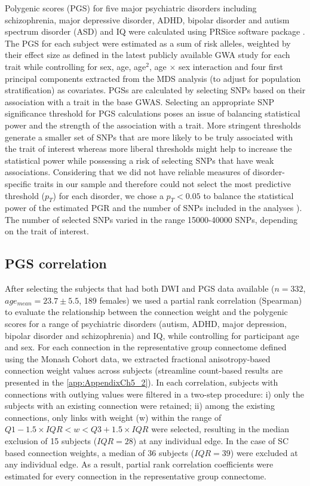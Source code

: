 Polygenic scores (PGS) for five major psychiatric disorders including schizophrenia, major depressive disorder, ADHD, bipolar disorder and autism spectrum disorder (ASD) and IQ were calculated using PRSice software package \citep{Euesden2015}. The PGS for each subject were estimated as a sum of risk alleles, weighted by their effect size as defined in the latest publicly available GWA study for each trait \citep{Neale2010,Ripke2014a,Ruderfer2018,Savage2018,AutismConsortium2017,Wray2018} while controlling for sex, age, age$^{2}$, age $\times$ sex interaction and four first principal components extracted from the MDS analysis (to adjust for population stratification) as covariates. PGSs are calculated by selecting SNPs based on their association with a trait in the base GWAS. Selecting an appropriate SNP significance threshold for PGS calculations poses an issue of balancing statistical power and the strength of the association with a trait. More stringent thresholds generate a smaller set of SNPs that are more likely to be truly associated with the trait of interest whereas more liberal thresholds might help to increase the statistical power while possessing a risk of selecting SNPs that have weak associations. Considering that we did not have reliable measures of disorder-specific traits in our sample and therefore could not select the most predictive threshold ($p_{T}$) for each disorder, we chose a $p_{T}<0.05$ to balance the statistical power of the estimated PGR and the number of SNPs included in the analyses \citep{Ripke2014a}). The number of selected SNPs varied in the range \num{15 000}-\num{40 000} SNPs, depending on the trait of interest.

\subsection{PGS correlation}

After selecting the subjects that had both DWI and PGS data available ($n= 332$, $age_{mean} = 23.7 \pm 5.5$, 189 females) we used a partial rank correlation (Spearman) to evaluate the relationship between the connection weight and the polygenic scores for a range of psychiatric disorders (autism, ADHD, major depression, bipolar disorder and schizophrenia) and IQ, while controlling for participant age and sex. For each connection in the representative group connectome defined using the Monash Cohort data, we extracted fractional anisotropy-based connection weight values across subjects (streamline count-based results are presented in the \ref{app:AppendixCh5_2}). In each correlation, subjects with connections with outlying values were filtered in a two-step procedure: i) only the subjects with an existing connection were retained; ii) among the existing connections, only links with weight (w) within the range of $Q1-1.5 \times IQR< w <Q3+1.5 \times IQR$ were selected, resulting in the median exclusion of 15 subjects ($IQR = 28$) at any individual edge. In the case of SC based connection weights, a median of 36 subjects ($IQR=39$) were excluded at any individual edge. As a result, partial rank correlation coefficients were estimated for every connection in the representative group connectome.

